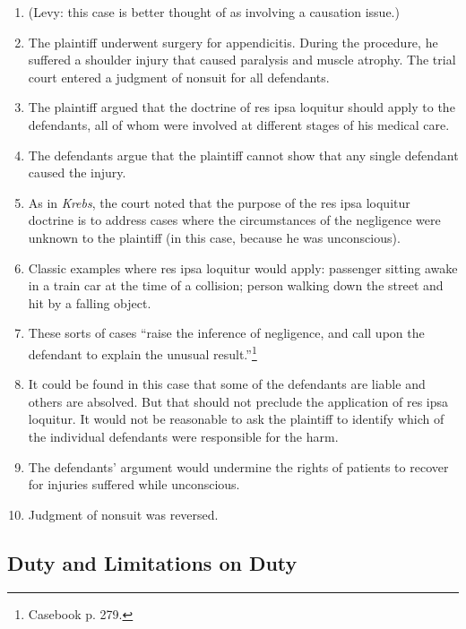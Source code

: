 \begin{enumerate}
    \item (Levy: this case is better thought of as involving a causation issue.)
    \item The plaintiff underwent surgery for appendicitis. During the procedure, he suffered a shoulder injury that caused paralysis and muscle atrophy. The trial court entered a judgment of nonsuit for all defendants.
    \item The plaintiff argued that the doctrine of res ipsa loquitur should apply to the defendants, all of whom were involved at different stages of his medical care.
    \item The defendants argue that the plaintiff cannot show that any single defendant caused the injury.
    \item As in \emph{Krebs}, the court noted that the purpose of the res ipsa loquitur doctrine is to address cases where the circumstances of the negligence were unknown to the plaintiff (in this case, because he was unconscious).
    \item Classic examples where res ipsa loquitur would apply: passenger sitting awake in a train car at the time of a collision; person walking down the street and hit by a falling object.
    \item These sorts of cases ``raise the inference of negligence, and call upon the defendant to explain the unusual result.''\footnote{Casebook p. 279.}
    \item It could be found in this case that some of the defendants are liable and others are absolved. But that should not preclude the application of res ipsa loquitur. It would not be reasonable to ask the plaintiff to identify which of the individual defendants were responsible for the harm.
    \item The defendants' argument would undermine the rights of patients to recover for injuries suffered while unconscious.
    \item Judgment of nonsuit was reversed.
\end{enumerate}

\subsection{Duty and Limitations on Duty}

